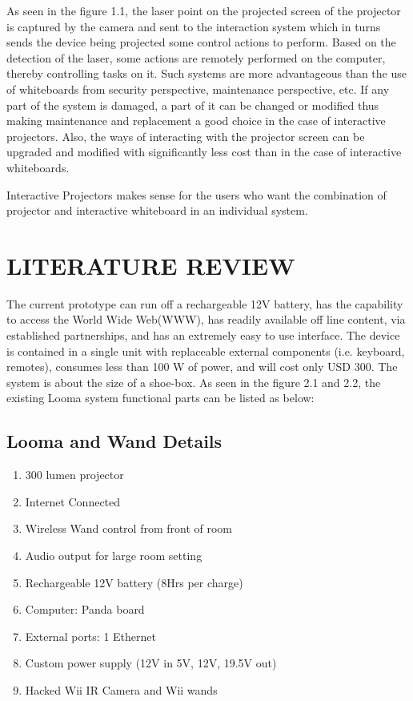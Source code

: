 \documentclass[12pt, a4paper]{article}
\begin{document}
As seen in the figure 1.1, the laser point on the projected screen of the projector is captured by the camera and sent to the interaction system which in turns sends the device being projected some control actions to perform. Based on the detection of the laser, some actions are remotely performed on the computer, thereby controlling tasks on it. Such systems are more advantageous than
the use of whiteboards from security perspective, maintenance perspective,
etc. If any part of the system is damaged, a part of it can be changed
or modified thus making maintenance and replacement a good choice in the
case of interactive projectors. Also, the ways of interacting with the projector
screen can be upgraded and modified with significantly less cost than in the
case of interactive whiteboards. 

Interactive Projectors makes sense for the
users who want the combination of projector and interactive whiteboard in
an individual system. 
\clearpage
\newpage
\section{LITERATURE REVIEW}
The current prototype can run off a rechargeable 12V battery, has the capability to access the World Wide Web(WWW), has readily available off line content, via established partnerships, and has an extremely easy to use interface. The device is contained in a single unit with replaceable external components (i.e. keyboard, remotes), consumes less than 100 W of power, and will cost only USD 300. The system is about the size of a shoe-box. 
As seen in the figure 2.1 and 2.2, the existing Looma system functional parts can be listed as below:
\subsection{Looma and Wand Details}
\begin{enumerate}
\item300 lumen projector
\item Internet Connected 
\item Wireless Wand control from front of room
\item Audio output for large room setting
\item Rechargeable 12V battery (8Hrs per charge)
\item Computer: Panda board
\item External ports: 1 Ethernet
\item Custom power supply (12V in 5V, 12V, 19.5V out)
\item Hacked Wii IR Camera and Wii wands
\end{enumerate}
\end{document}
